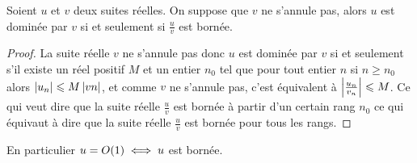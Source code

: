 \begin{prop}
  Soient \(u\) et \(v\) deux suites réelles. On suppose que \(v\) ne s'annule pas, alors \(u\) est dominée par \(v\) si et seulement si \(\frac{u}{v}\) est bornée.
\end{prop}
\begin{proof}
    La suite réelle \(v\) ne s'annule pas donc \(u\) est dominée par \(v\) si et seulement s'il existe un réel positif \(M\) et un entier \(n_0\) tel que pour tout entier \(n\) si \(n \geqslant n_0\) alors \(\left\lvert u_n\right\rvert \leqslant M \left\lvert vn\right\rvert\), et comme \(v\) ne s'annule pas, c'est équivalent à \(\left\lvert\frac{u_n}{v_n}\right\rvert \leqslant M\). Ce qui veut dire que la suite réelle \(\frac{u}{v}\) est bornée à partir d'un certain rang \(n_0\) ce qui équivaut à dire que la suite réelle \(\frac{u}{v}\) est bornée pour tous les rangs.
\end{proof}

En particulier \(u=O\mathopen{}\left(1\right) \iff u\) est bornée.

